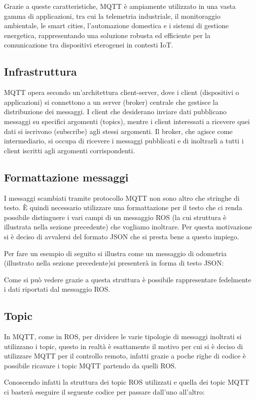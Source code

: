 \noindent Grazie a queste caratteristiche, MQTT è ampiamente utilizzato in una vasta gamma di applicazioni, tra cui la telemetria industriale, il monitoraggio ambientale, le smart cities, l'automazione domestica e i sistemi di gestione energetica, rappresentando una soluzione robusta ed efficiente per la comunicazione tra dispositivi eterogenei in contesti IoT.

\subsection{Infrastruttura}
\noindent MQTT opera secondo un'architettura client-server, dove i client (dispositivi o applicazioni) si connettono a un server (broker) centrale che gestisce la distribuzione dei messaggi. I client che desiderano inviare dati pubblicano messaggi su specifici argomenti (topics), mentre i client interessati a ricevere quei dati si iscrivono (subscribe) agli stessi argomenti. Il broker, che agisce come intermediario, si occupa di ricevere i messaggi pubblicati e di inoltrarli a tutti i client iscritti agli argomenti corrispondenti.

\subsection{Formattazione messaggi}
I messaggi scambiati tramite protocollo MQTT non sono altro che stringhe di testo. È quindi necessario utilizzare una formattazione per il testo che ci renda possibile distinguere i vari campi di un messaggio ROS (la cui struttura è illustrata nella sezione precedente) che vogliamo inoltrare. Per questa motivazione si è deciso di avvalersi del formato JSON che si presta bene a questo impiego.

\noindent Per fare un esempio di seguito si illustra come un messaggio di odometria (illustrato nella sezione precedente)si presenterà in forma di testo JSON:



\noindent Come si può vedere grazie a questa struttura è possibile rappresentare fedelmente i dati riportati dal messaggio ROS.

\subsection{Topic}
In MQTT, come in ROS, per dividere le varie tipologie di messaggi inoltrati si utilizzano i topic, questo in realtà è esattamente il motivo per cui si è deciso di utilizzare MQTT per il controllo remoto, infatti grazie a poche righe di codice è possibile ricavare i topic MQTT partendo da quelli ROS.

\noindent Conoscendo infatti la struttura dei topic ROS utilizzati e quella dei topic MQTT ci basterà eseguire il seguente codice per passare dall'uno all'altro:



